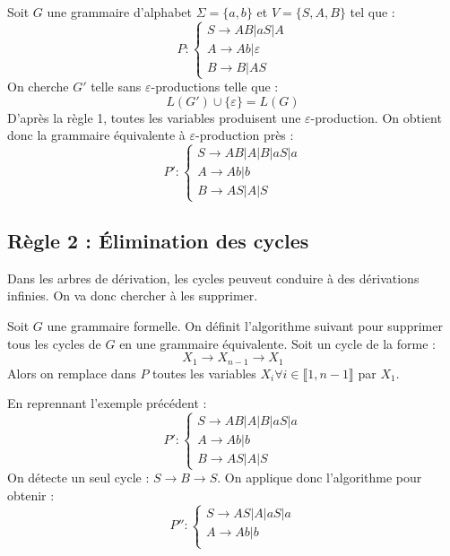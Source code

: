 \begin{example}
    Soit $G$ une grammaire d'alphabet $\Sigma = \{a,b\}$ et $V = \{S,A,B\}$ tel que :
        \[ P : 
            \begin{cases}
                S \longrightarrow AB | aS | A \\ 
                A \longrightarrow Ab | \varepsilon \\ 
                B \longrightarrow B | AS 
            \end{cases}
        \] 
    On cherche $G'$ telle sans $\varepsilon$-productions telle que :
        \[ L(G') \cup \{\varepsilon\} = L(G) \] 
    D'après la règle 1, toutes les variables produisent une $\varepsilon$-production. 
    On obtient donc la grammaire équivalente à $\varepsilon$-production près :
        \[ P' : 
            \begin{cases}
                S \longrightarrow AB | A | B | aS | a \\ 
                A \longrightarrow Ab | b \\ 
                B \longrightarrow AS | A | S 
            \end{cases} \] 
\end{example}

\subsection{Règle 2 : Élimination des cycles}

Dans les arbres de dérivation, les cycles peuveut conduire à des dérivations infinies. 
On va donc chercher à les supprimer. 

\newpage 

\begin{definition}
    Soit $G$ une grammaire formelle. On définit l'algorithme suivant pour 
    supprimer tous les cycles de $ G$ en une grammaire équivalente. 
    Soit un cycle de la forme : 
        \[ X_1 \longrightarrow X_{n-1} \longrightarrow X_1 \] 
    Alors on remplace dans $P$ toutes les variables $X_i \forall i \in \llbracket 1, n-1 \rrbracket$ 
    par $X_1$. 
\end{definition}

\begin{example}
    En reprennant l'exemple précédent : 
    \[ P' : 
            \begin{cases}
                S \longrightarrow AB | A | B | aS | a \\ 
                A \longrightarrow Ab | b \\ 
                B \longrightarrow AS | A | S 
            \end{cases} \] 
    On détecte un seul cycle : $ S \longrightarrow B \longrightarrow S$. 
    On applique donc l'algorithme pour obtenir : 
    \[ P'' : 
            \begin{cases}
                S \longrightarrow AS | A | aS | a \\ 
                A \longrightarrow Ab | b \\ 
            \end{cases} \] 
\end{example}

